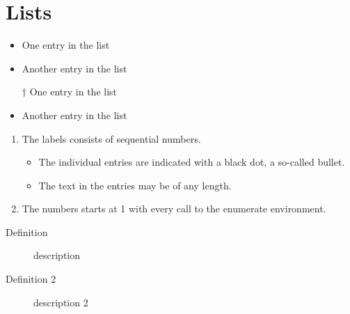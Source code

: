 \documentclass{article}
\begin{document}
\section{Lists}

\begin{itemize}
  \item One entry in the list
  \item Another entry in the list
\end{itemize}

\begin{itemize}
  \item[$\dagger$] One entry in the list
  \item Another entry in the list
\end{itemize}

 \renewcommand{\labelenumi}{\Roman{enumi}}
 \begin{enumerate}
   \item The labels consists of sequential numbers.
   \begin{itemize}
     \item The individual entries are indicated with a black dot, a so-called bullet.
     \item The text in the entries may be of any length.
   \end{itemize}
   \item The numbers starts at 1 with every call to the enumerate environment.
\end{enumerate}


\begin{description}
  \item[Definition] description
  \item[Definition 2] description 2
\end{description}
\end{document}
